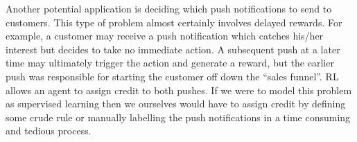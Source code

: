 \documentclass[a4paper,11pt]{article}
\numberwithin{equation}{section}
\theoremstyle{remark}
\begin{document}
Another potential application is deciding which push notifications to send to customers. This type of problem almost certainly involves delayed rewards. For example, a customer may receive a push notification which catches his/her interest but decides to take no immediate action. A subsequent push at a later time may ultimately trigger the action and generate a reward, but the earlier push was responsible for starting the customer off down the ``sales funnel''. RL allows an agent to assign credit to both pushes. If we were to model this problem as supervised learning then we ourselves would have to assign credit by defining some crude rule or manually labelling the push notifications in a time consuming and tedious process. 
\end{document}
